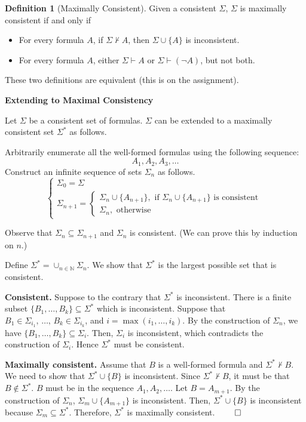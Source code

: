 \documentclass[11pt]{article}
\theoremstyle{definition}
\newtheorem{defn}[thm]{Definition}
\newcommand{\N}{\ensuremath{\mathbb{N}}}
\begin{document}
\begin{defn}[Maximally Consistent]
Given a consistent $\Sigma$, $\Sigma$ is maximally consistent if and only if \vspace{-0.25cm}
\begin{itemize}
    \item For every formula $A$, if $\Sigma \nvdash A$, then $\Sigma \cup \{A\}$ is inconsistent.
    \item For every formula $A$, either $\Sigma \vdash A$ or $\Sigma \vdash (\neg A)$, but not both.
\end{itemize}
\vspace{-0.25cm}
These two definitions are equivalent (this is on the assignment).
\end{defn}

{\bf Extending to Maximal Consistency}

Let $\Sigma$ be a consistent set of formulas. $\Sigma$ can be extended to a maximally consistent set $\Sigma^*$ as follows.

Arbitrarily enumerate all the well-formed formulas using the following sequence:
$$A_1, A_2, A_3, \dots$$
Construct an infinite sequence of sets $\Sigma_n$ as follows.
$$\begin{cases} \Sigma_0 = \Sigma \\
\Sigma_{n+1} = \begin{cases} \Sigma_n \cup \{A_{n+1}\}, \text{ if } \Sigma_n \cup \{A_{n+1}\} \text{ is consistent} \\ \Sigma_n, \text{ otherwise} \end{cases} \end{cases}$$

Observe that $\Sigma_n \subseteq \Sigma_{n+1}$ and $\Sigma_n$ is consistent. (We can prove this by induction on $n$.)

Define $\Sigma^* = \cup_{n\in\N} \Sigma_n$. We show that $\Sigma^*$ is the largest possible set that is consistent.

{\bf Consistent.} Suppose to the contrary that $\Sigma^*$ is inconsistent. There is a finite subset $\{B_1, \dots, B_k\} \subseteq \Sigma^*$ which is inconsistent. Suppose that $B_1 \in \Sigma_{i_1},\, \dots,\, B_k \in \Sigma_{i_k}$, and $i = \max(i_1, \dots, i_k)$. By the construction of $\Sigma_n$, we have $\{B_1, \dots, B_k\} \subseteq \Sigma_i$. Then, $\Sigma_i$ is inconsistent, which contradicts the construction of $\Sigma_i$. Hence $\Sigma^*$ must be consistent. 

{\bf Maximally consistent.} Assume that $B$ is a well-formed formula and $\Sigma^* \nvdash B$. We need to show that $\Sigma^* \cup \{B\}$ is inconsistent. Since $\Sigma^* \nvdash B$, it must be that $B \notin \Sigma^*$. $B$ must be in the sequence $A_1, A_2, \dots$. Let $B = A_{m+1}$. By the construction of $\Sigma_n$, $\Sigma_m \cup \{A_{m+1}\}$ is inconsistent. Then, $\Sigma^* \cup \{B\}$ is inconsistent because $\Sigma_m \subseteq \Sigma^*$. Therefore, $\Sigma^*$ is maximally consistent. \hspace{3.5cm} $\qed$
\end{document}
